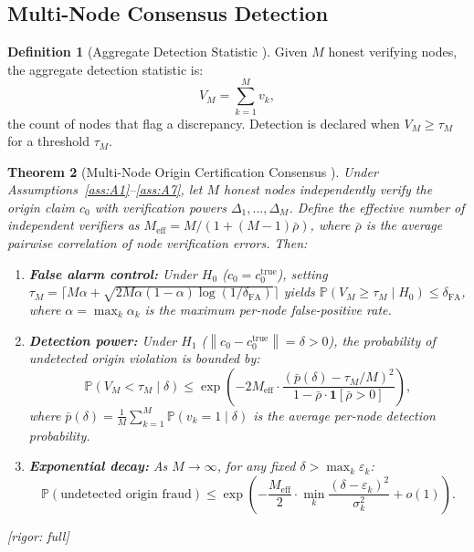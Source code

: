\documentclass[11pt,a4paper]{article}
\newtheorem{theorem}{Theorem}[section]
\theoremstyle{definition}
\newtheorem{definition}[theorem]{Definition}
\theoremstyle{remark}
\newcommand{\rigorFull}{\textcolor{green!60!black}{[rigor: full]}}
\newcommand{\Pbb}{\mathbb{P}}
\newcommand{\ind}[1]{\mathbf{1}[#1]}
\newcommand{\norm}[1]{\left\lVert#1\right\rVert}
\begin{document}
\subsection{Multi-Node Consensus Detection}

\begin{definition}[Aggregate Detection Statistic ]
\label{def:aggregate_detection}
Given $M$ honest verifying nodes, the aggregate detection statistic is:
\begin{equation}
    V_M = \sum_{k=1}^{M} v_k,
    \label{eq:V_M}
\end{equation}
the count of nodes that flag a discrepancy. Detection is declared when $V_M \geq \tau_M$ for a threshold $\tau_M$.
\end{definition}

\begin{theorem}[Multi-Node Origin Certification Consensus ]
\label{thm:origin}
Under Assumptions~\ref{ass:A1}--\ref{ass:A7}, let $M$ honest nodes independently verify the origin claim $c_0$ with verification powers $\Delta_1, \ldots, \Delta_M$. Define the effective number of independent verifiers as $M_{\mathrm{eff}} = M / (1 + (M-1)\bar{\rho})$, where $\bar{\rho}$ is the average pairwise correlation of node verification errors. Then:

\begin{enumerate}[label=(\roman*)]
    \item \textbf{False alarm control:} Under $H_0$ ($c_0 = c_0^{\text{true}}$), setting $\tau_M = \lceil M \alpha + \sqrt{2M \alpha (1-\alpha) \log(1/\delta_{\text{FA}})} \rceil$ yields $\Pbb(V_M \geq \tau_M \mid H_0) \leq \delta_{\text{FA}}$, where $\alpha = \max_k \alpha_k$ is the maximum per-node false-positive rate.
    
    \item \textbf{Detection power:} Under $H_1$ ($\norm{c_0 - c_0^{\text{true}}} = \delta > 0$), the probability of undetected origin violation is bounded by:
    \begin{equation}
        \Pbb(V_M < \tau_M \mid \delta) \leq \exp\left(-2M_{\mathrm{eff}} \cdot \frac{(\bar{p}(\delta) - \tau_M/M)^2}{1 - \bar{\rho} \cdot \ind{\bar{\rho} > 0}}\right),
        \label{eq:origin_detection_bound}
    \end{equation}
    where $\bar{p}(\delta) = \frac{1}{M}\sum_{k=1}^{M} \Pbb(v_k = 1 \mid \delta)$ is the average per-node detection probability.
    
    \item \textbf{Exponential decay:} As $M \to \infty$, for any fixed $\delta > \max_k \varepsilon_k$:
    \begin{equation}
        \Pbb(\text{undetected origin fraud}) \leq \exp\left(-\frac{M_{\mathrm{eff}}}{2} \cdot \min_k \frac{(\delta - \varepsilon_k)^2}{\sigma_k^2} + o(1)\right).
        \label{eq:exponential_decay}
    \end{equation}
\end{enumerate}
\rigorFull
\end{theorem}
\end{document}

